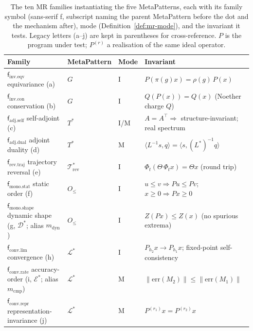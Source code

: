 \documentclass[acmsmall,screen,review]{acmart}
\begin{document}
\begin{table}[h]
\centering
\caption{The ten MR families instantiating the five MetaPatterns, each with its family symbol (sans-serif f, subscript naming the parent MetaPattern before the dot and the mechanism after), mode (Definition~\ref{def:mr-mode}), and the invariant it tests. Legacy letters (a--j) are kept in parentheses for cross-reference. $P$ is the program under test; $P^{(r)}$ a realisation of the same ideal operator.}
\label{tab:mr-families}
\small
\begin{tabular}{llll}
\toprule
\textbf{Family} & \textbf{MetaPattern} & \textbf{Mode} & \textbf{Invariant} \\
\midrule
$\mathsf{f}_{\mathrm{inv}.\mathrm{eqv}}$ equivariance (a) & $G$ & I & $P(\pi(g)x)=\rho(g)\,P(x)$ \\
$\mathsf{f}_{\mathrm{inv}.\mathrm{con}}$ conservation (b) & $G$ & I & $Q(P(x))=Q(x)$ (Noether charge $Q$) \\
$\mathsf{f}_{\mathrm{adj}.\mathrm{self}}$ self-adjoint (c) & $T^{*}$ & I/M & $A{=}A^{\top}\!\Rightarrow$ structure-invariant; real spectrum \\
$\mathsf{f}_{\mathrm{adj}.\mathrm{dual}}$ adjoint duality (d) & $T^{*}$ & M & $\langle L^{-1}s,q\rangle=\langle s,(L^{*})^{-1}q\rangle$ \\
$\mathsf{f}_{\mathrm{rev}.\mathrm{traj}}$ trajectory reversal (e) & $\mathcal{T}^{*}_{\mathrm{rev}}$ & I & $\Phi_t(\Theta\,\Phi_t x)=\Theta x$ (round trip) \\
$\mathsf{f}_{\mathrm{mono}.\mathrm{stat}}$ static order (f) & $O_{\le}$ & I & $u\le v\Rightarrow P u\le P v$; $x\ge 0\Rightarrow P x\ge 0$ \\
$\mathsf{f}_{\mathrm{mono}.\mathrm{shape}}$ dynamic shape (g, $\mathcal{D}^{*}$; alias $m_{\mathrm{dyn}}$) & $O_{\le}$ & I & $Z(P x)\le Z(x)$ (no spurious extrema) \\
$\mathsf{f}_{\mathrm{conv}.\mathrm{lim}}$ convergence (h) & $\mathcal{L}^{*}$ & I & $P_{h_2}x{\to}P_{h_1}x$; fixed-point self-consistency \\
$\mathsf{f}_{\mathrm{conv}.\mathrm{rate}}$ accuracy-order (i, $\mathcal{E}^{*}$; alias $m_{\mathrm{cmp}}$) & $\mathcal{L}^{*}$ & M & $\lVert\mathrm{err}(M_2)\rVert\le\lVert\mathrm{err}(M_1)\rVert$ \\
$\mathsf{f}_{\mathrm{conv}.\mathrm{repr}}$ representation-invariance (j) & $\mathcal{L}^{*}$ & M & $P^{(r_1)}x=P^{(r_2)}x$ \\
\bottomrule
\end{tabular}
\end{table}
\end{document}

